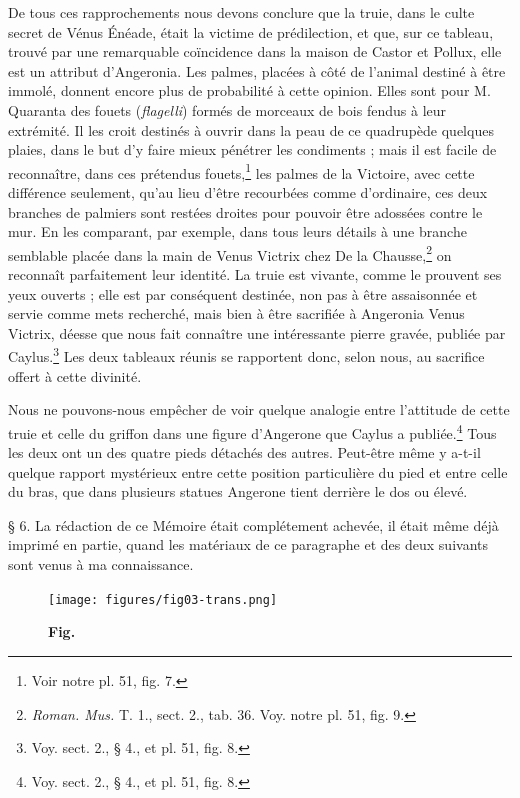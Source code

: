 \documentclass[a4paper, 11pt, oneside, polutonikogreek, french]{article}
\begin{document}
De tous ces rapprochements nous devons conclure que la truie, dans le culte secret de Vénus Énéade, était la victime de prédilection, et que, sur ce tableau, trouvé par une remarquable coïncidence dans la maison de Castor et Pollux, elle est un attribut d'Angeronia. Les palmes, placées à côté de l'animal destiné à être immolé, donnent encore plus de probabilité à cette opinion. Elles sont pour M. Quaranta des fouets (\emph{flagelli}) formés de morceaux de bois fendus à leur extrémité. Il les croit destinés à ouvrir dans la peau de ce quadrupède quelques plaies, dans le but d'y faire mieux pénétrer les condiments ; mais il est facile de reconnaître, dans ces prétendus fouets,\footnote{Voir notre pl. 51, fig. 7.} les palmes de la Victoire, avec cette différence seulement, qu'au lieu d'être recourbées comme d'ordinaire, ces deux branches de palmiers sont restées droites pour pouvoir être adossées contre le mur. En les comparant, par exemple, dans tous leurs détails à une branche semblable placée dans la main de Venus Victrix chez De la Chausse,\footnote{\emph{Roman. Mus.} T. 1., sect. 2., tab. 36. Voy. notre pl. 51, fig. 9.} on reconnaît parfaitement leur identité. La truie est vivante, comme le prouvent ses yeux ouverts ; elle est par conséquent destinée, non pas à être assaisonnée et servie comme mets recherché, mais bien à être sacrifiée à Angeronia Venus Victrix, déesse que nous fait connaître une intéressante pierre gravée, publiée par Caylus.\footnote{Voy. sect. 2., § 4., et pl. 51, fig. 8.} Les deux tableaux réunis se rapportent donc, selon nous, au sacrifice offert à cette divinité.

Nous ne pouvons-nous empêcher de voir quelque analogie entre l'attitude de cette truie et celle du griffon dans une figure d'Angerone que Caylus a publiée.\footnote{Voy. sect. 2., § 4., et pl. 51, fig. 8.} Tous les deux ont un des quatre pieds détachés des autres. Peut-être même y a-t-il quelque rapport mystérieux entre cette position particulière du pied et entre celle du bras, que dans plusieurs statues Angerone tient derrière le dos ou élevé.

§ 6. La rédaction de ce Mémoire était complétement achevée, il était même déjà imprimé en partie, quand les matériaux de ce paragraphe et des deux suivants sont venus à ma connaissance.

\begin{figure}[H]
\centering
\texttt{[image: figures/fig03-trans.png]}
\caption{\bfseries Fig.}
\end{figure}
\end{document}
